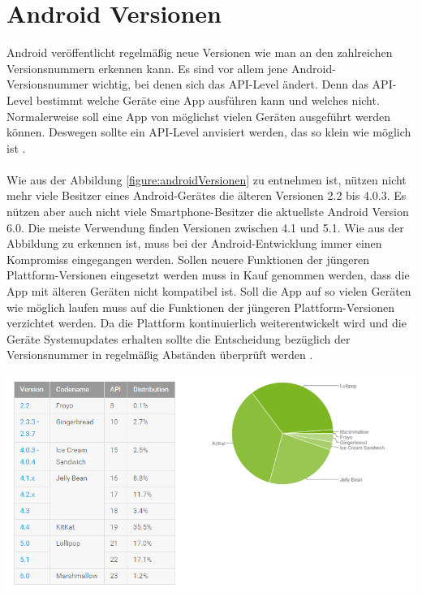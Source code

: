 \section{Android Versionen}
Android veröffentlicht regelmäßig neue Versionen wie man an den zahlreichen Versionsnummern erkennen kann. Es sind vor allem jene Android-Versionsnummer wichtig, bei denen sich das API-Level ändert. Denn das API-Level bestimmt welche Geräte eine App ausführen kann und welches nicht. Normalerweise soll eine App von möglichst vielen Geräten ausgeführt werden können. Deswegen sollte ein API-Level anvisiert werden, das so klein wie möglich ist \cite{gargenta:einfuhrung}.
\\\\
Wie aus der Abbildung \ref{figure:androidVersionen} zu entnehmen ist, nützen nicht mehr viele Besitzer eines Android-Gerätes die älteren Versionen 2.2 bis 4.0.3. Es nützen aber auch nicht viele Smartphone-Besitzer die aktuellste Android Version 6.0. Die meiste Verwendung finden Versionen zwischen 4.1 und 5.1. Wie aus der Abbildung zu erkennen ist, muss bei der Android-Entwicklung 
immer einen Kompromiss eingegangen werden. Sollen neuere Funktionen der jüngeren Plattform-Versionen eingesetzt werden muss in Kauf genommen werden, dass die App mit älteren Geräten nicht kompatibel ist. Soll die App auf so vielen Geräten wie möglich laufen muss auf die Funktionen der jüngeren Plattform-Versionen verzichtet werden. Da die Plattform kontinuierlich weiterentwickelt wird und die Geräte Systemupdates erhalten sollte die Entscheidung bezüglich der Versionsnummer in regelmäßig Abständen überprüft werden \cite{gargenta:einfuhrung}.

\begin{minipage}{\textwidth} 
	\centering	
	\includegraphics[width=1\textwidth]{figures/android_versionen.png}
	\label{figure:androidVersionen}
	\vspace{2ex}
\end{minipage}
 

